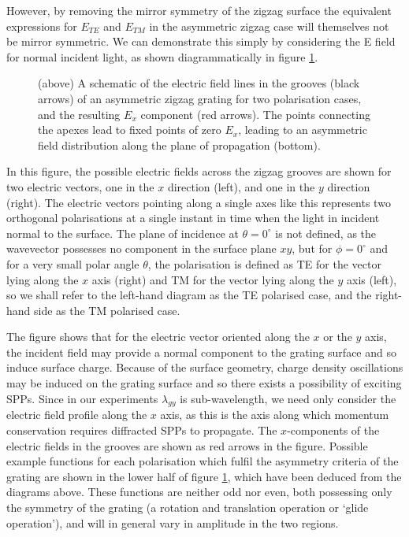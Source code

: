 However, by removing the mirror symmetry of the zigzag surface the equivalent expressions for $E_{TE}$ and $E_{TM}$ in the asymmetric zigzag case will themselves not be mirror symmetric. We can demonstrate this simply by considering the E field for normal incident light, as shown diagrammatically in figure \ref{fig:asymcouplingcartoon}. 

\begin{figure}
\def\svgwidth{1\linewidth}

\caption[A schematic of the electric field lines in the grooves of an asymmetric zigzag grating for two polarisation cases.]{(above) A schematic of the electric field lines in the grooves (black arrows) of an asymmetric zigzag grating for two polarisation cases, and the resulting $E_x$ component (red arrows). The points connecting the apexes lead to fixed points of zero $E_x$, leading to an asymmetric field distribution along the plane of propagation (bottom).\label{fig:asymcouplingcartoon}}
\end{figure}

In this figure, the possible electric fields across the zigzag grooves are shown for two electric vectors, one in the $x$ direction (left), and one in the $y$ direction (right). The electric vectors pointing along a single axes like this represents two orthogonal polarisations at a single instant in time when the light in incident normal to the surface. The plane of incidence at $\theta=0^\circ$ is not defined, as the wavevector possesses no component in the surface plane $xy$, but for $\phi=0^\circ$ and for a very small polar angle $\theta$, the polarisation is defined as TE for the vector lying along the $x$ axis (right) and TM for the vector lying along the $y$ axis (left), so we shall refer to the left-hand diagram as the TE polarised case, and the right-hand side as the TM polarised case.

The figure shows that for the electric vector oriented along the $x$ or the $y$ axis, the incident field may provide a normal component to the grating surface and so induce surface charge. Because of the surface geometry, charge density oscillations may be induced on the grating surface and so there exists a possibility of exciting SPPs. Since in our experiments $\lambda_{gy}$ is sub-wavelength, we need only consider the electric field profile along the $x$ axis, as this is the axis along which momentum conservation requires diffracted SPPs to propagate. The $x$-components of the electric fields in the grooves are shown as red arrows in the figure. Possible example functions for each polarisation which fulfil the asymmetry criteria of the grating are shown in the lower half of figure \ref{fig:asymcouplingcartoon}, which have been deduced from the  diagrams above. These functions are neither odd nor even, both possessing only the symmetry of the grating (a rotation and translation operation or `glide operation'), and will in general vary in amplitude in the two regions. 

